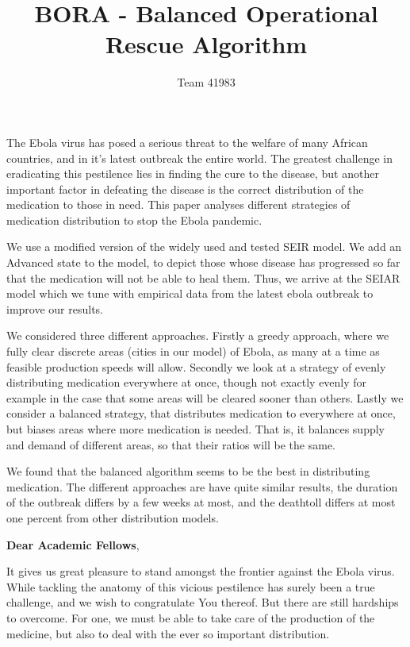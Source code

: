 \documentclass[12pt]{article}
\title{BORA - Balanced Operational Rescue Algorithm}
\author{Team 41983}
\date{}                                           %
\begin{document}

\abstract

\noindent 
The Ebola virus has posed a serious threat to the welfare of many African countries, and in it's latest outbreak the entire world. The greatest challenge in eradicating this pestilence lies in finding the cure to the disease, but another important factor in defeating the disease is the correct distribution of the medication to those in need. This paper analyses different strategies of medication distribution to stop the Ebola pandemic.


We use a modified version of the widely used and tested SEIR model. We add an Advanced state to the model, to depict those whose disease has progressed so far that the medication will not be able to heal them. Thus, we arrive at the SEIAR model which we tune with empirical data from the latest ebola outbreak to improve our results.


We considered three different approaches. Firstly a greedy approach, where we fully clear discrete areas (cities in our model) of Ebola, as many at a time as feasible production speeds will allow. Secondly we look at a strategy of evenly distributing medication everywhere at once, though not exactly evenly for example in the case that some areas will be cleared sooner than others. Lastly we consider a balanced strategy, that distributes medication to everywhere at once, but biases areas where more medication is needed. That is, it balances supply and demand of different areas, so that their ratios will be the same.


We found that the balanced algorithm seems to be the best in distributing medication. The different approaches are have quite similar results, the duration of the outbreak differs by a few weeks at most, and the deathtoll differs at most one percent from other distribution models.

\newpage

\tableofcontents

\newpage

\noindent
\textbf{Dear Academic Fellows},

\hspace{10mm}

\noindent
It gives us great pleasure to stand amongst the frontier against the Ebola virus. While tackling the anatomy of this vicious pestilence has surely been a true challenge, and we wish to congratulate You thereof. But there are still hardships to overcome. For one, we must be able to take care of the production of the medicine, but also to deal with the ever so important distribution. 
\end{document}
